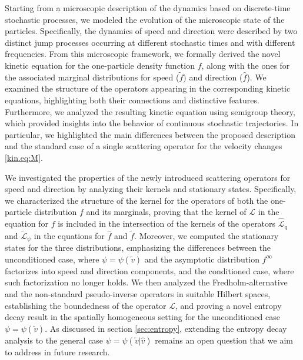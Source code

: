 \documentclass[a4paper]{article}
\theoremstyle{Theorem}\newtheorem{proposition}{Proposition}[section]
\theoremstyle{Remark}\newtheorem{remark}{Remark}[section]
\theoremstyle{Theorem}\newtheorem{theorem}{Theorem}[section]
\newcommand{\hv}{\hat{v}}
\newcommand{\tv}{\tilde{v}}
\newcommand{\hf}{\hat{f}}
\newcommand{\tf}{\tilde{f}}
\begin{document}
Starting from a microscopic description of the dynamics based on discrete-time stochastic processes, we modeled the evolution of the microscopic state of the particles. Specifically, the dynamics of speed and direction were described by two distinct jump processes occurring at different stochastic times and with different frequencies. From this microscopic framework, we formally derived the novel kinetic equation for the one-particle density function $f$, along with the ones for the associated marginal distributions for speed ($\tf$) and direction ($\hf$). We examined the structure of the operators appearing in the corresponding kinetic equations, highlighting both their connections and distinctive features. Furthermore, we analyzed the resulting kinetic equation using semigroup theory, which provided insights into the behavior of continuous stochastic trajectories. In particular, we highlighted the main differences between the proposed description and the standard case of a single scattering operator for the velocity changes \eqref{kin.eq:M}.

We investigated the properties of the newly introduced scattering operators for speed and direction by analyzing their kernels and stationary states. Specifically, we characterized the structure of the kernel for the operators of both the one-particle distribution $f$ and its marginals, proving that the kernel of $\mathcal{L}$ in the equation for $f$ is included in the intersection of the kernels of the operators $\hat{\mathcal{L}}_q$ and $\tilde{\mathcal{L}}_\psi$ in the equations for $\hf$ and $\tf$. Moreover, we computed the stationary states for the three distributions, emphasizing the differences between the unconditioned case, where $\psi=\psi(\tv)$ and the asymptotic distribution $f^{\infty}$ factorizes into speed and direction components, and the conditioned case, where such factorization no longer holds. We then analyzed the Fredholm-alternative and the non-standard pseudo-inverse operators in suitable Hilbert spaces, establishing the boundedness of the operator $\mathcal{L}$, and proving a novel entropy decay result in the spatially homogeneous setting for the unconditioned case $\psi=\psi(\tv)$. As discussed in section \ref{sec:entropy}, extending the entropy decay analysis to the general case $\psi=\psi(\tv|\hv)$ remains an open question that we aim to address in future research.
\end{document}
